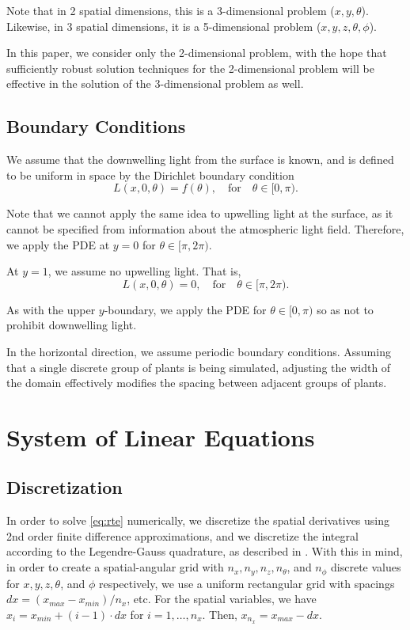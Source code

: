 Note that in 2 spatial dimensions, this is a 3-dimensional problem ($x,y,\theta$).
Likewise, in 3 spatial dimensions, it is a 5-dimensional problem ($x,y,z,\theta,\phi$).

In this paper, we consider only the 2-dimensional problem, with the hope that sufficiently robust solution techniques for the 2-dimensional problem will be effective in the solution of the 3-dimensional problem as well.

\subsection{Boundary Conditions}
We assume that the downwelling light from the surface is known, and is defined to be uniform in space by the Dirichlet boundary condition
\begin{equation}
    L(x,0,\theta) = f(\theta), \quad \mbox{for} \quad \theta \in [0,\pi).
    \label{eq:surf_bc}
\end{equation}

Note that we cannot apply the same idea to upwelling light at the surface, as it cannot be specified from information about the atmospheric light field.
Therefore, we apply the PDE at $y=0$ for $\theta \in [\pi,2\pi)$.

At $y=1$, we assume no upwelling light.
That is,
\begin{equation}
    L(x,0,\theta) = 0, \quad \mbox{for} \quad \theta \in [\pi,2\pi).
    \label{eq:bottom_bc}
\end{equation}

As with the upper $y$-boundary, we apply the PDE for $\theta \in [0,\pi)$ so as not to prohibit downwelling light.

In the horizontal direction, we assume periodic boundary conditions.
Assuming that a single discrete group of plants is being simulated, adjusting the width of the domain effectively modifies the spacing between adjacent groups of plants.

\section{System of Linear Equations}

\subsection{Discretization}
In order to solve \eqref{eq:rte} numerically, we discretize the spatial derivatives using 2nd order finite difference approximations, and we discretize the integral according to the Legendre-Gauss quadrature, as described in \cite[Chapter 2]{chandrasekhar_radiative_1960}.
With this in mind, in order to create a spatial-angular grid with $n_x,n_y,
n_z, n_\theta$, and $n_\phi$ discrete values for $x, y, z, \theta$, and $\phi$
respectively, we use a uniform rectangular grid with spacings $dx = (x_{max} -
x_{min})/n_x$, etc. For the spatial variables, we have $x_i = x_{min} + (i-1) \cdot dx$
for $i=1,\ldots, n_x$. Then, $x_{n_x} = x_{max} - dx$.


